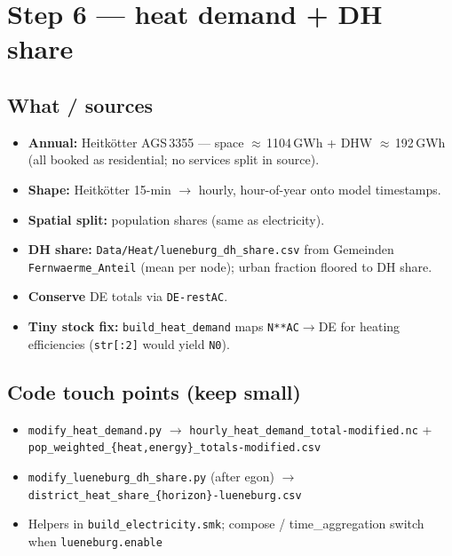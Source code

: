 \documentclass[11pt,a4paper]{article}
\begin{document}
\section{Step 6 --- heat demand + DH share}

\noindent{}

\vspace{0.8em}

\subsection{What / sources}
\begin{itemize}[leftmargin=*]
  \item \textbf{Annual:} Heitkötter AGS\,3355 --- space $\approx$\,1104\,GWh + DHW $\approx$\,192\,GWh
        (all booked as residential; no services split in source).
  \item \textbf{Shape:} Heitkötter 15-min $\to$ hourly, hour-of-year onto model timestamps.
  \item \textbf{Spatial split:} population shares (same as electricity).
  \item \textbf{DH share:} \texttt{Data/Heat/lueneburg\_dh\_share.csv} from Gemeinden
        \texttt{Fernwaerme\_Anteil} (mean per node); urban fraction floored to DH share.
  \item \textbf{Conserve} DE totals via \texttt{DE-restAC}.
  \item \textbf{Tiny stock fix:} \texttt{build\_heat\_demand} maps \texttt{N**AC}$\to$DE
        for heating efficiencies (\texttt{str[:2]} would yield \texttt{N0}).
\end{itemize}

\subsection{Code touch points (keep small)}
\begin{itemize}[leftmargin=*]
  \item \texttt{modify\_heat\_demand.py} $\to$
        \texttt{hourly\_heat\_demand\_total-modified.nc} +
        \texttt{pop\_weighted\_\{heat,energy\}\_totals-modified.csv}
  \item \texttt{modify\_lueneburg\_dh\_share.py} (after egon)
        $\to$ \texttt{district\_heat\_share\_\{horizon\}-lueneburg.csv}
  \item Helpers in \texttt{build\_electricity.smk}; compose / time\_aggregation switch
        when \texttt{lueneburg.enable}
\end{itemize}
\end{document}
